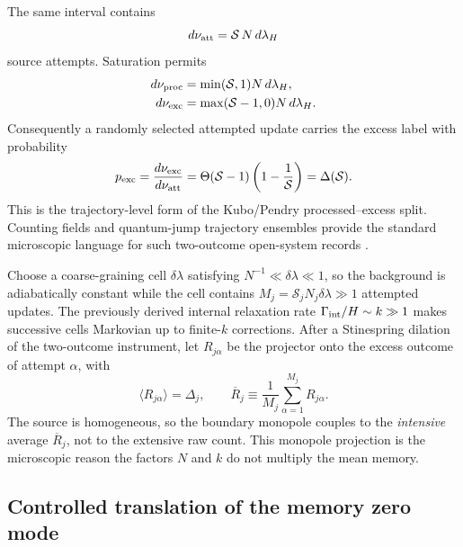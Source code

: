 \documentclass[aps,prd,twocolumn,10pt,superscriptaddress,nofootinbib]{revtex4-2}
\begin{document}
The same interval contains
\begin{equation}
d\nu_{\rm att}=\mathcal S\,N\,d\lambda_H
\label{eq:pb_attempted_slots}
\end{equation}
source attempts.  Saturation permits
\begin{align}
d\nu_{\rm proc}&=\min(\mathcal S,1)N\,d\lambda_H,\notag\\
d\nu_{\rm exc}&=\max(\mathcal S-1,0)N\,d\lambda_H.
\label{eq:pb_slot_split}
\end{align}
Consequently a randomly selected attempted update carries the excess label
with probability
\begin{equation}
p_{\rm exc}
=\frac{d\nu_{\rm exc}}{d\nu_{\rm att}}
=\Theta(\mathcal S-1)\left(1-\frac1{\mathcal S}\right)
=\Delta(\mathcal S).
\label{eq:pb_rejection_probability}
\end{equation}
This is the trajectory-level form of the Kubo/Pendry processed--excess split.
Counting fields and quantum-jump trajectory ensembles provide the standard
microscopic language for such two-outcome open-system records
\cite{Esposito2009,Garrahan2010}.

Choose a coarse-graining cell $\delta\lambda$ satisfying
$N^{-1}\ll\delta\lambda\ll1$, so the background is adiabatically constant
while the cell contains
$M_j=\mathcal S_jN_j\delta\lambda\gg1$ attempted updates.  The previously
derived internal relaxation rate $\Gamma_{\rm int}/H\sim k\gg1$ makes
successive cells Markovian up to finite-$k$ corrections.  After a
Stinespring dilation of the two-outcome instrument, let
$R_{j\alpha}$ be the projector onto the excess outcome of attempt $\alpha$,
with
\begin{equation}
\langle R_{j\alpha}\rangle=\Delta_j,
\qquad
\overline R_j\equiv\frac1{M_j}\sum_{\alpha=1}^{M_j}R_{j\alpha}.
\label{eq:pb_rejection_projector}
\end{equation}
The source is homogeneous, so the boundary monopole couples to the
\emph{intensive} average $\overline R_j$, not to the extensive raw count.
This monopole projection is the microscopic reason the factors $N$ and $k$
do not multiply the mean memory.

\subsection{Controlled translation of the memory zero mode}
\label{sec:pb_controlled_write}
\end{document}
